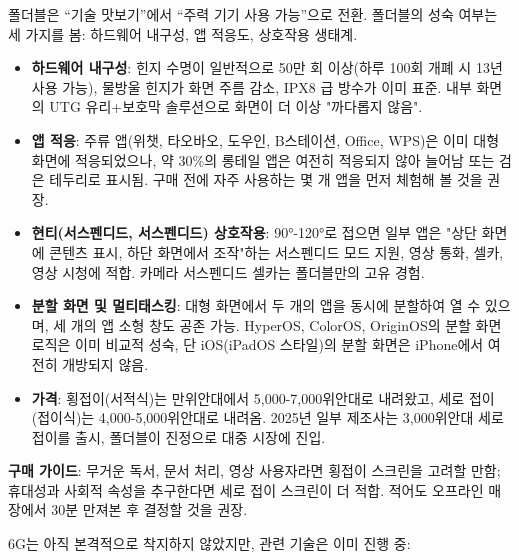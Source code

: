 
폴더블은 “기술 맛보기”에서 “주력 기기 사용 가능”으로 전환. 폴더블의 성숙 여부는 세 가지를 봄: 하드웨어 내구성, 앱 적응도, 상호작용 생태계.

\begin{itemize}
  \item \textbf{하드웨어 내구성}: 힌지 수명이 일반적으로 50만 회 이상(하루 100회 개폐 시 13년 사용 가능), 물방울 힌지가 화면 주름 감소, IPX8 급 방수가 이미 표준. 내부 화면의 UTG 유리+보호막 솔루션으로 화면이 더 이상 "까다롭지 않음".
  \item \textbf{앱 적응}: 주류 앱(위챗, 타오바오, 도우인, B스테이션, Office, WPS)은 이미 대형 화면에 적응되었으나, 약 30\%의 롱테일 앱은 여전히 적응되지 않아 늘어남 또는 검은 테두리로 표시됨. 구매 전에 자주 사용하는 몇 개 앱을 먼저 체험해 볼 것을 권장.
  \item \textbf{현티(서스펜디드, 서스펜디드) 상호작용}: 90°-120°로 접으면 일부 앱은 "상단 화면에 콘텐츠 표시, 하단 화면에서 조작"하는 서스펜디드 모드 지원, 영상 통화, 셀카, 영상 시청에 적합. 카메라 서스펜디드 셀카는 폴더블만의 고유 경험.
  \item \textbf{분할 화면 및 멀티태스킹}: 대형 화면에서 두 개의 앱을 동시에 분할하여 열 수 있으며, 세 개의 앱 소형 창도 공존 가능. HyperOS, ColorOS, OriginOS의 분할 화면 로직은 이미 비교적 성숙, 단 iOS(iPadOS 스타일)의 분할 화면은 iPhone에서 여전히 개방되지 않음.
  \item \textbf{가격}: 횡접이(서적식)는 만위안대에서 5,000-7,000위안대로 내려왔고, 세로 접이(접이식)는 4,000-5,000위안대로 내려옴. 2025년 일부 제조사는 3,000위안대 세로 접이를 출시, 폴더블이 진정으로 대중 시장에 진입.
\end{itemize}

\textbf{구매 가이드}: 무거운 독서, 문서 처리, 영상 사용자라면 횡접이 스크린을 고려할 만함; 휴대성과 사회적 속성을 추구한다면 세로 접이 스크린이 더 적합. 적어도 오프라인 매장에서 30분 만져본 후 결정할 것을 권장.


6G는 아직 본격적으로 착지하지 않았지만, 관련 기술은 이미 진행 중:

